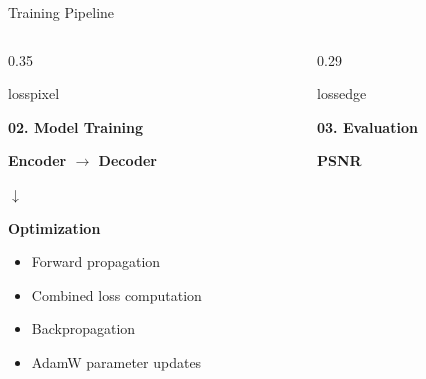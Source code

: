 \documentclass[
    11pt,%
    aspectratio=169,%
]{beamer}
\begin{document}
\begin{frame}{Training Pipeline}
\begin{columns}[T,onlytextwidth]
\begin{column}{0.35\textwidth}

\begin{beamercolorbox}[
    wd=\linewidth,
    sep=0.09cm,
    rounded=true,
    center
]{losspixel}

    {\color{LossNavy}\bfseries 02. Model Training}

\end{beamercolorbox}

\vspace{0.13cm}

\begin{center}

{\color{LossNavy}\bfseries
Encoder $\longrightarrow$ Decoder}

\vspace{0.10cm}

{\color{fptOrange}\Large
$\downarrow$}

\vspace{0.04cm}

{\color{LossNavy}\bfseries Optimization}

\end{center}

\vspace{0.02cm}

\begin{itemize}
    \setlength{\itemsep}{2pt}
    \setlength{\topsep}{2pt}
    \item Forward propagation
    \item Combined loss computation
    \item Backpropagation
    \item AdamW parameter updates
\end{itemize}

\end{column}


\begin{column}{0.29\textwidth}

\begin{beamercolorbox}[
    wd=\linewidth,
    sep=0.09cm,
    rounded=true,
    center
]{lossedge}

    {\color{LossNavy}\bfseries 03. Evaluation}

\end{beamercolorbox}

\vspace{0.10cm}

{\color{LossNavy}\bfseries\large PSNR}


\end{column}
\end{columns}
\end{frame}
\end{document}
